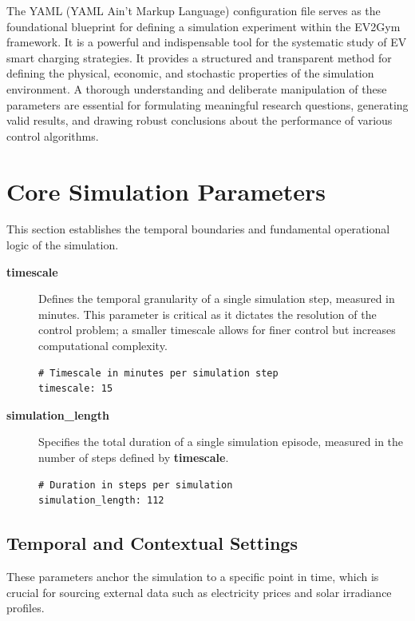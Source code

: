 The YAML (YAML Ain't Markup Language) configuration file serves as the foundational blueprint for defining a simulation experiment within the EV2Gym framework.
It is a powerful and indispensable tool for the systematic study of EV smart charging strategies. It provides a structured and transparent method for defining the physical, economic, and stochastic properties of the simulation environment. A thorough understanding and deliberate manipulation of these parameters are essential for formulating meaningful research questions, generating valid results, and drawing robust conclusions about the performance of various control algorithms.

\section{Core Simulation Parameters}

This section establishes the temporal boundaries and fundamental operational logic of the simulation.

\begin{description}
    \item[\textbf{\textbf{timescale}}] Defines the temporal granularity of a single simulation step, measured in minutes. This parameter is critical as it dictates the resolution of the control problem; a smaller timescale allows for finer control but increases computational complexity.
    \begin{lstlisting}
# Timescale in minutes per simulation step
timescale: 15 
    \end{lstlisting}

    \item[\textbf{\textbf{simulation\_length}}] Specifies the total duration of a single simulation episode, measured in the number of steps defined by \textbf{timescale}.
    \begin{lstlisting}
# Duration in steps per simulation
simulation_length: 112 
    \end{lstlisting}
\end{description}

\subsection{Temporal and Contextual Settings}

These parameters anchor the simulation to a specific point in time, which is crucial for sourcing external data such as electricity prices and solar irradiance profiles.

